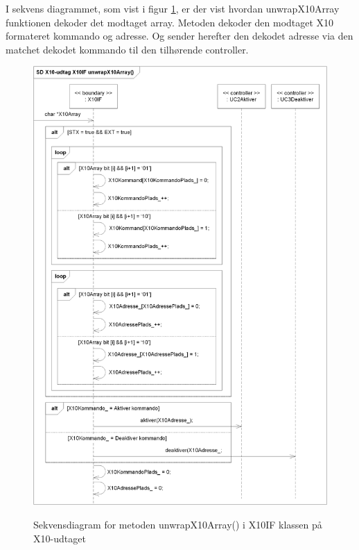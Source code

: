 I sekvens diagrammet, som vist i figur \ref{fig:X10_udtag_unwrapX10Array_SD}, er der vist hvordan unwrapX10Array funktionen dekoder det modtaget array. Metoden dekoder den modtaget X10 formateret kommando og adresse. Og sender herefter den dekodet adresse via den matchet dekodet kommando til den tilhørende controller.

\begin{figure}[!htb]
     {\includegraphics[width=\textwidth]{billeder/uml/X10-Udtag_unwrapX10Array_SD}}
     \caption{Sekvensdiagram for metoden unwrapX10Array() i X10IF klassen på X10-udtaget}
     \label{fig:X10_udtag_unwrapX10Array_SD}
\end{figure}


